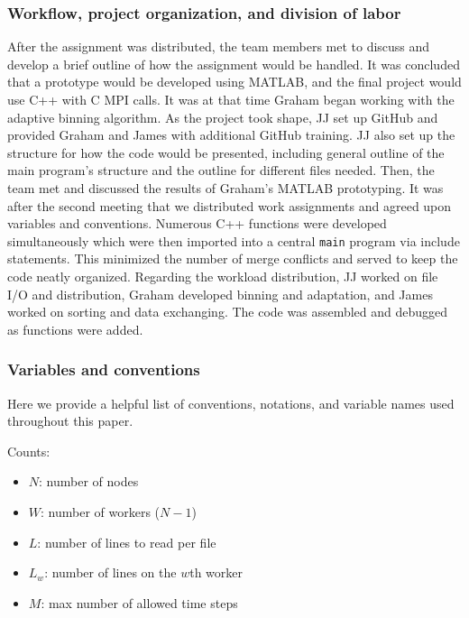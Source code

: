 \documentclass{article}
\begin{document}
\subsubsection{Workflow, project organization, and division of labor}
After the assignment was distributed, the team members met to discuss and develop a brief outline of how the assignment would be handled. It was concluded that a prototype would be developed using MATLAB, and the final project would use C++ with C MPI calls. It was at that time Graham began working with the adaptive binning algorithm. As the project took shape, JJ set up GitHub and provided Graham and James with additional GitHub training. JJ also set up the structure for how the code would be presented, including general outline of the main program's structure and the outline for different files needed. Then, the team met and discussed the results of Graham's MATLAB prototyping. It was after the second meeting that we distributed work assignments and agreed upon variables and conventions. Numerous C++ functions were developed simultaneously which were then imported into a central \texttt{main} program via include statements. This minimized the number of merge conflicts and served to keep the code neatly organized. Regarding the workload distribution, JJ worked on file I/O and distribution, Graham developed binning and adaptation, and James worked on sorting and data exchanging. The code was assembled and debugged as functions were added.

\subsubsection{Variables and conventions}

Here we provide a helpful list of conventions, notations, and variable names used throughout this paper.

\begin{mdframed}[backgroundcolor=blue!20]
	Counts:
	\setlength\itemsep{0.1pt}
	\setlength\parskip{0.1pt}
	\begin{itemize}
		\setlength\itemsep{0.1pt}
		\setlength\parskip{0.1pt}
		\item $N$: number of nodes
		\item $W$: number of workers ($N-1$)
		\item $L$: number of lines to read per file
		\item $L_w$: number of lines on the $w$th worker
		\item $M$: max number of allowed time steps
	\end{itemize}
\end{mdframed}
\end{document}
